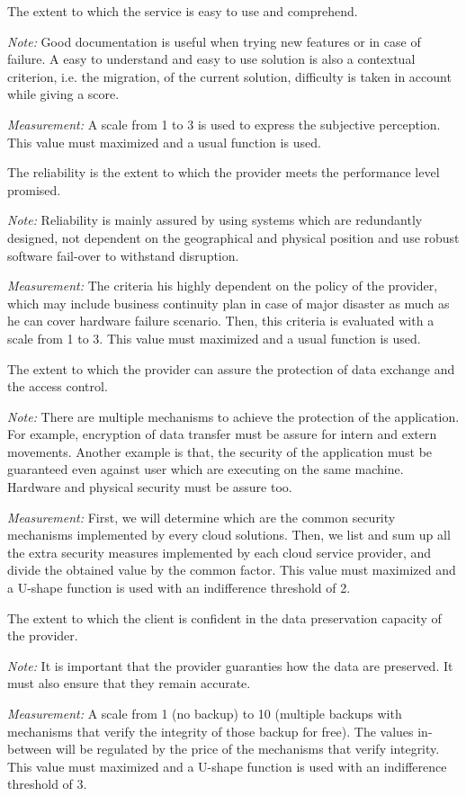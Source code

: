 \documentclass[a4paper,11pt]{article}
\begin{document}
\begin{description}[parsep=10pt,listparindent=\parindent,labelindent=\parindent,font=$\bullet$\ ]
  \item[Usability:] The extent to which the service is easy to use and comprehend.
    \par \emph{Note:} Good documentation is useful when trying new features or in case of failure. A easy to understand and easy to use solution is also a contextual criterion, i.e. the migration, of the current solution, difficulty is taken in account while giving a score.
    \par \emph{Measurement:} A scale from 1 to 3 is used to express the subjective perception. This value must maximized and a usual function is used.

  \item[Reliability:] The reliability is the extent to which the provider meets the performance level promised.
    \par \emph{Note:} Reliability is mainly assured by using systems which are redundantly designed, not dependent on the geographical and physical position and use robust software fail-over to withstand disruption.
    \par \emph{Measurement:} The criteria his highly dependent on the policy of the provider, which may include business continuity plan in case of major disaster as much as he can cover hardware failure scenario. Then, this criteria is evaluated with a scale from 1 to 3. This value must maximized and a usual function is used.

  \item[Security:] The extent to which the provider can assure the protection of data exchange and the access control.
    \par \emph{Note:} There are multiple mechanisms to achieve the protection of the application. For example, encryption of data transfer must be assure for intern and extern movements. Another example is that, the security of the application must be guaranteed even against user which are executing on the same machine. Hardware and physical security must be assure too. 
    \par \emph{Measurement:} First, we will determine which are the common security mechanisms implemented by every cloud solutions. Then, we list and sum up all the extra security measures implemented by each cloud service provider, and divide the obtained value by the common factor. This value must maximized and a U-shape function is used with an indifference threshold of 2.

  \item[Data Integrity:] The extent to which the client is confident in the data preservation capacity of the provider.
    \par \emph{Note:} It is important that the provider guaranties how the data are preserved. It must also ensure that they remain accurate.
    \par \emph{Measurement:} A scale from 1 (no backup) to 10 (multiple backups with mechanisms that verify the integrity of those backup for free). The values in-between will be regulated by the price of the mechanisms that verify integrity. This value must maximized and a U-shape function is used with an indifference threshold of 3.


\end{description}
\end{document}
